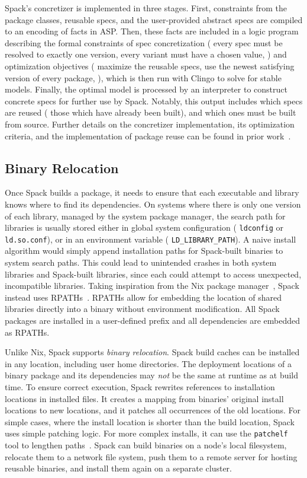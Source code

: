 Spack's concretizer is implemented in three stages. First, constraints from the
package classes, reusable specs, and the user-provided abstract specs are
compiled to an encoding of facts in ASP. Then, these facts are included in a
logic program describing the formal constraints of spec concretization (\eg{}
every spec must be resolved to exactly one version, every variant must have a
chosen value, \etc{}) and optimization objectives (\eg{} maximize the reusable
specs, use the newest satisfying version of every package, \etc{}), which is
then run with Clingo to solve for stable models. Finally, the optimal model
is processed by an interpreter to construct concrete specs for further use by
Spack. Notably, this output includes which specs are reused (\ie{} those which have
already been built), and which ones must be built from source.
%
Further details on the concretizer implementation, its optimization criteria,
and the implementation of package reuse can be found in prior work~\cite{gamblin2022asp}.

%
\subsection{Binary Relocation}
\label{sec:spack-relocation}
Once Spack builds a package, it needs to ensure that each executable and library knows
where to find its dependencies. On systems where there is only one version of each
library, managed by the system package manager, the search path for
libraries is usually stored either in global system configuration (\eg{} {\tt ldconfig} or {\tt
  ld.so.conf}), or in an environment variable (\eg{} \texttt{LD\_LIBRARY\_PATH}). A
naive install algorithm would simply append installation paths for Spack-built binaries
to system search paths. This could lead to unintended crashes in both system
libraries and Spack-built libraries, since each could attempt to access unexpected,
incompatible libraries.
%
Taking inspiration from the Nix package
manager~\cite{dolstra2004nix, dolstra2008nixos},
Spack instead uses RPATHs~\cite{gamblin2015spack}.
RPATHs allow for embedding the location of shared libraries directly into a
binary without environment modification. All
Spack packages are installed in a user-defined prefix and all dependencies are
embedded as RPATHs.

Unlike Nix, Spack supports {\it binary relocation}. Spack build caches can be installed
in any location, including user home directories. The deployment locations of a binary
package and its dependencies may {\it not} be the same at runtime as at build time. To
ensure correct execution, Spack rewrites references to installation locations in
installed files. It creates a mapping from binaries' original
install locations to new locations, and it patches all occurrences of the old locations.
%
For simple cases, where the install location is shorter than the build location, Spack
uses simple patching logic. For more complex installs, it can use the \texttt{patchelf}
tool to lengthen paths~\cite{dolstra-patchelf}.
%
Spack can build binaries on a node's local filesystem,
relocate them to a network file system, push them to a remote server for hosting
reusable binaries, and install them again on a separate cluster.


